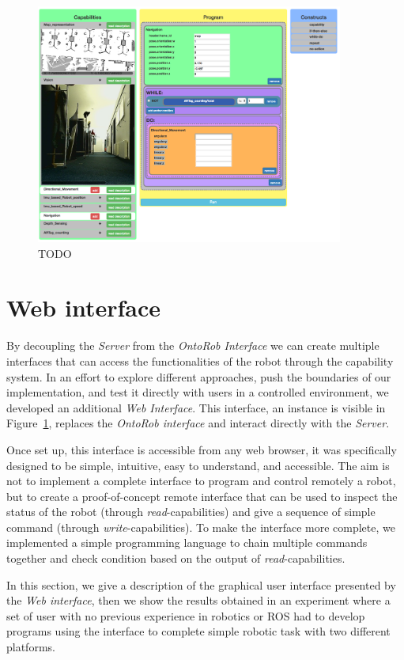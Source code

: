 \begin{figure}[t]
    \centering
    \includegraphics[width=0.9\textwidth]{gfx/onto/web}
    \caption{TODO}\label{fig:web-api}
\end{figure}

\section{Web interface}
By decoupling the \textit{Server} from the \textit{OntoRob Interface} we can create multiple interfaces that can access the functionalities of the robot through the capability system. In an effort to explore different approaches, push the boundaries of our implementation, and test it directly with users in a controlled environment, we developed an additional \textit{Web Interface}. This interface, an instance is visible in Figure~\ref{fig:web-api}, replaces the \textit{OntoRob interface} and interact directly with the \textit{Server}.

Once set up, this interface is accessible from any web browser, it was specifically designed to be simple, intuitive, easy to understand, and accessible. The aim is not to implement a complete interface to program and control remotely a robot, but to create a proof-of-concept remote interface that can be used to inspect the status of the robot (through \textit{read}-capabilities) and give a sequence of simple command (through \textit{write}-capabilities). To make the interface more complete, we implemented a simple programming language to chain multiple commands together and check condition based on the output of \textit{read}-capabilities.

In this section, we give a description of the graphical user interface presented by the \textit{Web interface}, then we show the results obtained in an experiment where a set of user with no previous experience in robotics or ROS had to develop programs using the interface to complete simple robotic task with two different platforms.

